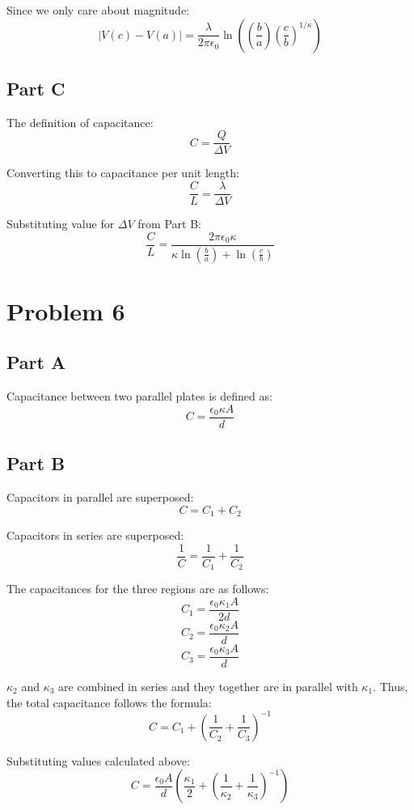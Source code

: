 \documentclass{article}
\begin{document}
Since we only care about magnitude:
$$ \vert V(c) - V(a) \vert = \frac{ \lambda }{ 2 \pi \epsilon_{0}} \ln \left(
\left( \frac{ b }{ a } \right) \left( \frac{ c }{ b } \right)^{1/\kappa} \right)  $$

\subsection*{Part C}

The definition of capacitance:
$$ C = \frac{ Q }{ \Delta V } $$

Converting this to capacitance per unit length:
$$ \frac{ C }{ L } = \frac{ \lambda }{ \Delta V } $$

Substituting value for $\Delta V$ from Part B:
$$ \frac{ C }{ L } = \frac{ 2 \pi \epsilon_{0} \kappa }{ \kappa \ln\left( \frac{
b }{ a } \right) + \ln\left( \frac{ c }{ b } \right) } $$

\section*{Problem 6}

\subsection*{Part A}

Capacitance between two parallel plates is defined as:
$$ C = \frac{ \epsilon_{0} \kappa A }{ d } $$

\subsection*{Part B}

Capacitors in parallel are superposed:
$$ C = C_{1} + C_{2} $$

Capacitors in series are superposed:
$$ \frac{ 1 }{ C } = \frac{ 1 }{ C_{1} } + \frac{ 1 }{ C_{2} } $$

The capacitances for the three regions are as follows:
$$ C_{1} = \frac{ \epsilon_{0} \kappa_{1} A }{ 2 d } $$
$$ C_{2} = \frac{ \epsilon_{0} \kappa_{2} A }{ d } $$
$$ C_{3} = \frac{ \epsilon_{0} \kappa_{3} A }{ d } $$

$\kappa_{2}$ and $\kappa_{3}$ are combined in series and they together are in
parallel with $\kappa _{1}$. Thus, the total capacitance follows the formula:
$$ C = C_{1} + \left( \frac{ 1 }{ C_{2} } + \frac{ 1 }{ C_{3} } \right)^{-1} $$

Substituting values calculated above:
$$ C = \frac{ \epsilon_{0} A }{ d } \left( \frac{ \kappa_{1} }{ 2 } + \left(
\frac{ 1 }{ \kappa_{2} } + \frac{ 1 }{ \kappa_{3} } \right)^{-1} \right) $$
\end{document}
